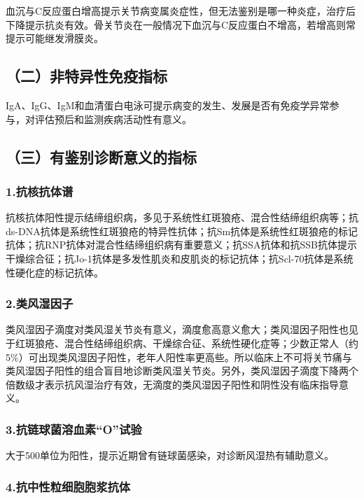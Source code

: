 血沉与C反应蛋白增高提示关节病变属炎症性，但无法鉴别是哪一种炎症，治疗后下降提示抗炎有效。骨关节炎在一般情况下血沉与C反应蛋白不增高，若增高则常提示可能继发滑膜炎。

\subsection{（二）非特异性免疫指标}

IgA、IgG、IgM和血清蛋白电泳可提示病变的发生、发展是否有免疫学异常参与，对评估预后和监测疾病活动性有意义。

\subsection{（三）有鉴别诊断意义的指标}

\subsubsection{1.抗核抗体谱}

抗核抗体阳性提示结缔组织病，多见于系统性红斑狼疮、混合性结缔组织病等；抗ds-DNA抗体是系统性红斑狼疮的特异性抗体；抗Sm抗体是系统性红斑狼疮的标记抗体；抗RNP抗体对混合性结缔组织病有重要意义；抗SSA抗体和抗SSB抗体提示干燥综合征；抗Jo-1抗体是多发性肌炎和皮肌炎的标记抗体；抗Scl-70抗体是系统性硬化症的标记抗体。

\subsubsection{2.类风湿因子}

类风湿因子滴度对类风湿关节炎有意义，滴度愈高意义愈大；类风湿因子阳性也见于红斑狼疮、混合性结缔组织病、干燥综合征、系统性硬化症等；少数正常人（约5\%）可出现类风湿因子阳性，老年人阳性率更高些。所以临床上不可将关节痛与类风湿因子阳性的组合盲目地诊断类风湿关节炎。另外，类风湿因子滴度下降两个倍数级才表示抗风湿治疗有效，无滴度的类风湿因子阳性和阴性没有临床指导意义。

\subsubsection{3.抗链球菌溶血素“O”试验}

大于500单位为阳性，提示近期曾有链球菌感染，对诊断风湿热有辅助意义。

\subsubsection{4.抗中性粒细胞胞浆抗体}

